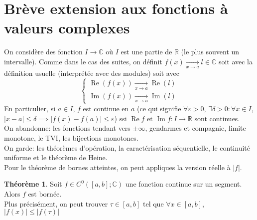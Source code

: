 \documentclass[10pt,a4paper]{article}
\theoremstyle{definition}
\newtheorem{theorem}[proposition]{Théorème}
\DeclareMathOperator{\re}{Re}
\DeclareMathOperator{\im}{Im}
\begin{document}
\section{Brève extension aux fonctions à valeurs complexes}
On considère des fonction $I \to \mathbb{C}$ où $I$ est une partie de $\mathbb{R}$ (le plus souvent un intervalle). Comme dans le cas des suites, on définit $f(x) \xrightarrow[x \to a]{} l \in \mathbb{C}$ soit avec la définition usuelle (interprétée avec des modules) soit avec
\[\begin{cases}
\re(f(x)) \xrightarrow[x \to a]{} \re(l) \\ \im(f(x)) \xrightarrow[x \to a]{} \im(l)
\end{cases}\]
En particulier, si $a \in I$, $f$ est continue en $a$ (ce qui signifie $\forall \varepsilon > 0$, $\exists \delta > 0: \forall x \in I$, $|x - a| \leq \delta \implies |f(x) - f(a)| \leq \varepsilon$) ssi $\re f$ et $\im f: I \to \mathbb{R}$ sont continues. \\
On abandonne: les fonctions tendant vers $\pm\infty$, gendarmes et compagnie, limite monotone, le TVI, les bijections monotones. \\
On garde: les théorèmes d'opération, la caractérisation séquentielle, le continuité uniforme et le théorème de Heine. \\
Pour le théorème de bornes atteintes, on peut appliques la version réelle à $|f|$.
\begin{theorem}
Soit $f \in C^0([a, b]; \mathbb{C})$ une fonction continue sur un segment. \\
Alors $f$ est bornée. \\
Plus précisément, on peut trouver $\tau \in [a, b]$ tel que $\forall x \in [a, b]$, $|f(x)| \leq |f(\tau)|$
\end{theorem}
\end{document}
